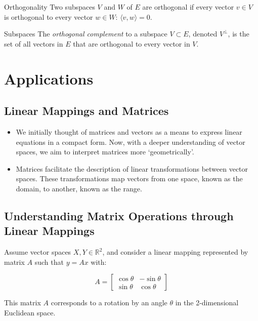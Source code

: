 \begin{definitionbox}{Orthogonality} 
Two subspaces \( V \) and \( W \) of \( E \) are orthogonal if every vector \( v \in V \) is orthogonal to every vector \( w \in W \): \( \langle v, w \rangle = 0 \).
\end{definitionbox}

\begin{definitionbox}{Subspaces} 
The \textit{orthogonal complement} to a subspace \( V \subset E \), denoted \( V^\perp \), is the set of all vectors in \( E \) that are orthogonal to every vector in \( V \).
\end{definitionbox}


\section{Applications}
\subsection{Linear Mappings and Matrices}

\begin{itemize}
    \item We initially thought of matrices and vectors as a means to express linear equations in a compact form. Now, with a deeper understanding of vector spaces, we aim to interpret matrices more `geometrically'.
    \item Matrices facilitate the description of linear transformations between vector spaces. These transformations map vectors from one space, known as the domain, to another, known as the range.
\end{itemize}

\subsection{Understanding Matrix Operations through Linear Mappings}

Assume vector spaces \( X, Y \in \mathbb{R}^2 \), and consider a linear mapping represented by matrix \( A \) such that \( y = Ax \) with:

\[ A = \begin{bmatrix} \cos \theta & -\sin \theta \\ \sin \theta & \cos \theta \end{bmatrix} \]

This matrix \( A \) corresponds to a rotation by an angle \( \theta \) in the 2-dimensional Euclidean space.

